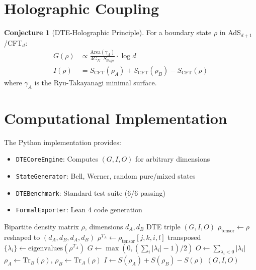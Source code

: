 \documentclass[11pt,a4paper]{article}
\theoremstyle{definition}
\newtheorem{conjecture}{Conjecture}[section]
\begin{document}
\section{Holographic Coupling}
\label{sec:holography}

\begin{conjecture}[DTE-Holographic Principle]
For a boundary state $\rho$ in AdS$_{d+1}$/CFT$_d$:
\begin{align}
G(\rho) &\propto \frac{\mathrm{Area}(\gamma_A)}{4G_N \cdot S_{\text{Page}}} \cdot \log d \\
I(\rho) &= S_{\text{CFT}}(\rho_A) + S_{\text{CFT}}(\rho_B) - S_{\text{CFT}}(\rho)
\end{align}
where $\gamma_A$ is the Ryu-Takayanagi minimal surface.
\end{conjecture}

\section{Computational Implementation}
\label{sec:compute}

The Python implementation provides:
\begin{itemize}
    \item \texttt{DTECoreEngine}: Computes $(G, I, O)$ for arbitrary dimensions
    \item \texttt{StateGenerator}: Bell, Werner, random pure/mixed states
    \item \texttt{DTEBenchmark}: Standard test suite (6/6 passing)
    \item \texttt{FormalExporter}: Lean 4 code generation
\end{itemize}

\begin{algorithm}[H]
\caption{DTE Triple Computation}
\begin{algorithmic}[1]
\Require Bipartite density matrix $\rho$, dimensions $d_A, d_B$
\Ensure DTE triple $(G, I, O)$
\State $\rho_{\text{tensor}} \gets \rho$ reshaped to $(d_A, d_B, d_A, d_B)$
\State $\rho^{T_A} \gets \rho_{\text{tensor}}[j, k, i, l]$ transposed
\State $\{\lambda_i\} \gets \text{eigenvalues}(\rho^{T_A})$
\State $G \gets \max(0, (\sum_i |\lambda_i| - 1)/2)$
\State $O \gets \sum_{\lambda_i < 0} |\lambda_i|$
\State $\rho_A \gets \mathrm{Tr}_B(\rho)$, $\rho_B \gets \mathrm{Tr}_A(\rho)$
\State $I \gets S(\rho_A) + S(\rho_B) - S(\rho)$
\State \Return $(G, I, O)$
\end{algorithmic}
\end{algorithm}
\end{document}
